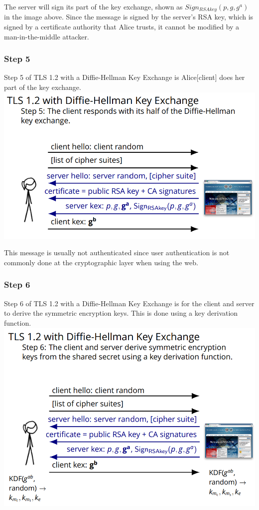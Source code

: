 \documentclass[11pt]{article} %
\begin{document}
{ The server will sign its part of the key exchange, shown as 
 $Sign_{RSAkey}(p,g,g^a)$ in the image above. Since the message is signed by 
 the server's RSA key, which is signed by a certificate authority that Alice 
 trusts, it cannot be modified by a man-in-the-middle attacker.

\newpage
\subsubsection{Step 5}
Step 5 of TLS 1.2 with a Diffie-Hellman Key Exchange is Alice[client] does her 
part of the key exchange. \\

\includegraphics[scale=.8]{./DiffieStep5.png}

This message is usually not authenticated since user authentication is not 
commonly done at the cryptographic layer when using the web.

\subsubsection{Step 6}
Step 6 of TLS 1.2 with a Diffie-Hellman Key Exchange is for the client and 
server to derive the symmetric encryption keys. This is done using a key 
derivation function. \\

\includegraphics[scale=.8]{./DiffieStep6.png}

}
\end{document}
